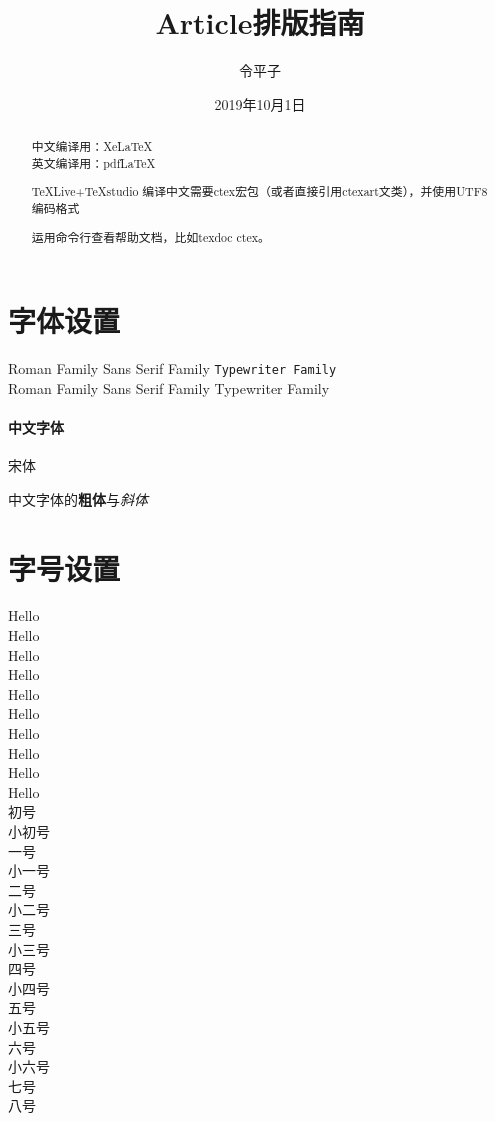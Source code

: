 \documentclass[UTF8]{article}  %
\title{Article排版指南}  %
\author{令平子}  %
\date{2019年10月1日} %
\begin{document}
\maketitle   %
\tableofcontents %

\begin{abstract}
\noindent	中文编译用：Xe\LaTeX \\
	英文编译用：pdf\LaTeX \\
\par	TeXLive+TeXstudio
	编译中文需要ctex宏包（或者直接引用ctexart文类），并使用UTF8编码格式
	
	运用命令行查看帮助文档，比如texdoc ctex。

\end{abstract}
\section{字体设置}
\noindent \textrm{Roman Family}  \textsf{Sans Serif Family} \texttt{Typewriter Family}\\%
\rmfamily Roman Family %
{\sffamily Sans Serif Family} {\ttfamily Typewriter Family}
\paragraph{中文字体}%
{\songti 宋体}  

中文字体的\textbf{粗体}与\textit{斜体}
\section{字号设置}
{\tiny Hello}\\
{\scriptsize Hello}\\
{\footnotesize Hello}\\
{\small Hello}\\
{\normalsize Hello}\\
{\large Hello}\\
{\Large Hello}\\
{\LARGE Hello}\\
{\huge Hello}\\
{\Huge Hello}\\
{ 初号}\\
{ 小初号}\\
{ 一号}\\
{ 小一号}\\
{ 二号}\\
{ 小二号}\\
{ 三号}\\
{ 小三号}\\
{ 四号}\\
{ 小四号}\\
{ 五号}\\
{ 小五号}\\
{ 六号}\\
{ 小六号}\\
{ 七号}\\
{ 八号}\\
\end{document}
